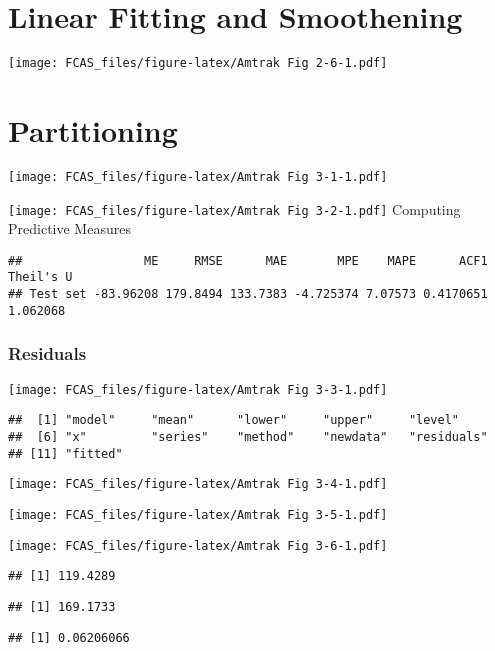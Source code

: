 \documentclass[]{article}
\begin{document}
\section{Linear Fitting and
Smoothening}\label{linear-fitting-and-smoothening}

\texttt{[image: FCAS\_files/figure-latex/Amtrak Fig 2-6-1.pdf]}

\section{Partitioning}\label{partitioning}

\texttt{[image: FCAS\_files/figure-latex/Amtrak Fig 3-1-1.pdf]}

\texttt{[image: FCAS\_files/figure-latex/Amtrak Fig 3-2-1.pdf]} Computing
Predictive Measures

\begin{verbatim}
##                 ME     RMSE      MAE       MPE    MAPE      ACF1 Theil's U
## Test set -83.96208 179.8494 133.7383 -4.725374 7.07573 0.4170651  1.062068
\end{verbatim}

\subsubsection{Residuals}\label{residuals}

\texttt{[image: FCAS\_files/figure-latex/Amtrak Fig 3-3-1.pdf]}

\begin{verbatim}
##  [1] "model"     "mean"      "lower"     "upper"     "level"    
##  [6] "x"         "series"    "method"    "newdata"   "residuals"
## [11] "fitted"
\end{verbatim}

\texttt{[image: FCAS\_files/figure-latex/Amtrak Fig 3-4-1.pdf]}

\texttt{[image: FCAS\_files/figure-latex/Amtrak Fig 3-5-1.pdf]}

\texttt{[image: FCAS\_files/figure-latex/Amtrak Fig 3-6-1.pdf]}

\begin{verbatim}
## [1] 119.4289
\end{verbatim}

\begin{verbatim}
## [1] 169.1733
\end{verbatim}

\begin{verbatim}
## [1] 0.06206066
\end{verbatim}
\end{document}
